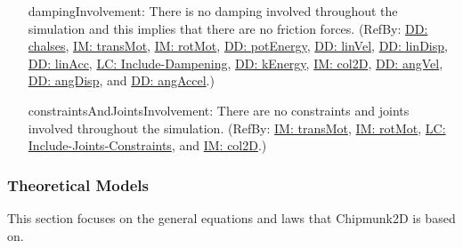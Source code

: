 \documentclass[12pt]{article}
\begin{document}
\begin{itemize}
\item[dampingInvolvement:\phantomsection\label{assumpDI}]There is no damping involved throughout the simulation and this implies that there are no friction forces. (RefBy: \hyperref[DD:chalses]{DD: chalses}, \hyperref[IM:transMot]{IM: transMot}, \hyperref[IM:rotMot]{IM: rotMot}, \hyperref[DD:potEnergy]{DD: potEnergy}, \hyperref[DD:linVel]{DD: linVel}, \hyperref[DD:linDisp]{DD: linDisp}, \hyperref[DD:linAcc]{DD: linAcc}, \hyperref[lcID]{LC: Include-Dampening}, \hyperref[DD:kEnergy]{DD: kEnergy}, \hyperref[IM:col2D]{IM: col2D}, \hyperref[DD:angVel]{DD: angVel}, \hyperref[DD:angDisp]{DD: angDisp}, and \hyperref[DD:angAccel]{DD: angAccel}.)
\item[constraintsAndJointsInvolvement:\phantomsection\label{assumpCAJI}]There are no constraints and joints involved throughout the simulation. (RefBy: \hyperref[IM:transMot]{IM: transMot}, \hyperref[IM:rotMot]{IM: rotMot}, \hyperref[lcIJC]{LC: Include-Joints-Constraints}, and \hyperref[IM:col2D]{IM: col2D}.)
\end{itemize}
\subsubsection{Theoretical Models}
\label{Sec:TMs}
This section focuses on the general equations and laws that Chipmunk2D is based on.
\par~
\end{document}
